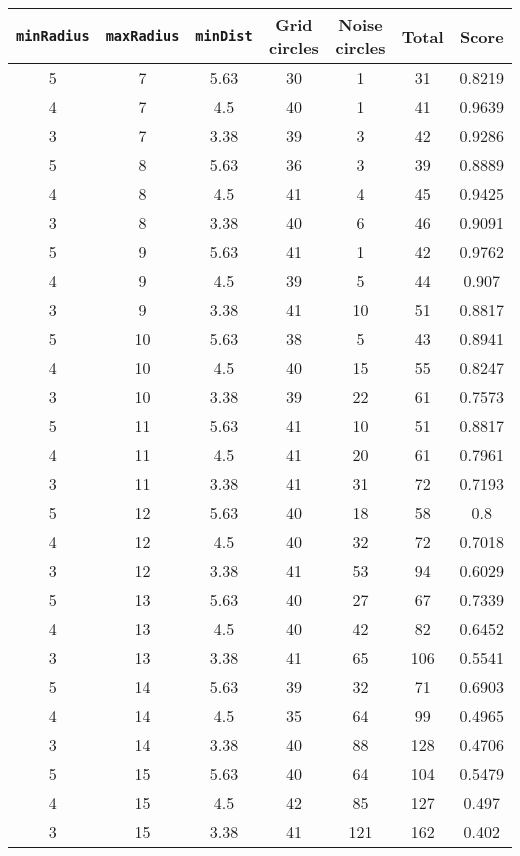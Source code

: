 \documentclass[letterpaper, 12pt]{article}
\begin{document}
\begin{longtable}{|c|c|c|c|c|c|c|}
\hline
\textbf{\texttt{minRadius}} & \textbf{\texttt{maxRadius}} & \textbf{\texttt{minDist}} & \textbf{Grid circles} & \textbf{Noise circles} & \textbf{Total} & \textbf{Score} \\
\hline
5 & 7 & 5.63 & 30 & 1 & 31 & 0.8219 \\
\hline
4 & 7 & 4.5 & 40 & 1 & 41 & 0.9639 \\
\hline
3 & 7 & 3.38 & 39 & 3 & 42 & 0.9286 \\
\hline
5 & 8 & 5.63 & 36 & 3 & 39 & 0.8889 \\
\hline
4 & 8 & 4.5 & 41 & 4 & 45 & 0.9425 \\
\hline
3 & 8 & 3.38 & 40 & 6 & 46 & 0.9091 \\
\hline
5 & 9 & 5.63 & 41 & 1 & 42 & 0.9762 \\
\hline
4 & 9 & 4.5 & 39 & 5 & 44 & 0.907 \\
\hline
3 & 9 & 3.38 & 41 & 10 & 51 & 0.8817 \\
\hline
5 & 10 & 5.63 & 38 & 5 & 43 & 0.8941 \\
\hline
4 & 10 & 4.5 & 40 & 15 & 55 & 0.8247 \\
\hline
3 & 10 & 3.38 & 39 & 22 & 61 & 0.7573 \\
\hline
5 & 11 & 5.63 & 41 & 10 & 51 & 0.8817 \\
\hline
4 & 11 & 4.5 & 41 & 20 & 61 & 0.7961 \\
\hline
3 & 11 & 3.38 & 41 & 31 & 72 & 0.7193 \\
\hline
5 & 12 & 5.63 & 40 & 18 & 58 & 0.8 \\
\hline
4 & 12 & 4.5 & 40 & 32 & 72 & 0.7018 \\
\hline
3 & 12 & 3.38 & 41 & 53 & 94 & 0.6029 \\
\hline
5 & 13 & 5.63 & 40 & 27 & 67 & 0.7339 \\
\hline
4 & 13 & 4.5 & 40 & 42 & 82 & 0.6452 \\
\hline
3 & 13 & 3.38 & 41 & 65 & 106 & 0.5541 \\
\hline
5 & 14 & 5.63 & 39 & 32 & 71 & 0.6903 \\
\hline
4 & 14 & 4.5 & 35 & 64 & 99 & 0.4965 \\
\hline
3 & 14 & 3.38 & 40 & 88 & 128 & 0.4706 \\
\hline
5 & 15 & 5.63 & 40 & 64 & 104 & 0.5479 \\
\hline
4 & 15 & 4.5 & 42 & 85 & 127 & 0.497 \\
\hline
3 & 15 & 3.38 & 41 & 121 & 162 & 0.402 \\

\end{longtable}
\end{document}
